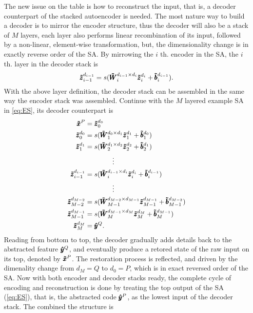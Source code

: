 {The new issue on the table is how to reconstruct the input, that is, a decoder counterpart of the stacked autoencoder is needed. The most nature way to build a decoder is to mirror the encoder structure, thus the decoder will also be a stack of $M$ layers, each layer also performs linear recombination of its input, followed by a non-linear, element-wise transformation, but, the dimensionality change is in exactly reverse order of the SA. By mirrowing the $i$ th. encoder in the SA, the $i$ th. layer in the decoder stack is
\begin{equation*}
  {\pmb{\tilde{z}}_{i-1}^{d_{i-1}}} = s(\pmb{\tilde{W}}_{i  }^{d_{i-1} \times d_{i  }} {\pmb{\tilde{z}}_{i  }^{d_{i  }}} + \pmb{\tilde{b}}_{i  }^{d_{i-1}}).
\end{equation*}
With the above layer definition, the decoder stack can be assembled in the same way the encoder stack was assembled. Continue with the $M$ layered example SA in \ref{eq:ES}, its decoder counterpart is
\begin{equation} \label{eq:DS}
\begin{split}
  \pmb{\tilde{x}}^P &= {\pmb{\tilde{z}}_{0}^{d_{0}}} \\
  {\pmb{\tilde{z}}_{0  }^{d_{0  }}} &= s(\pmb{\tilde{W}}_{1  }^{d_{0  } \times d_{1  }} {\pmb{\tilde{z}}_{1  }^{d_{1  }}} + \pmb{\tilde{b}}_{1  }^{d_{0  }}) \\
  {\pmb{\tilde{z}}_{1  }^{d_{1  }}} &= s(\pmb{\tilde{W}}_{2  }^{d_{1  } \times d_{2  }} {\pmb{\tilde{z}}_{2  }^{d_{2  }}} + \pmb{\tilde{b}}_{2  }^{d_{1  }}) \\
  & \quad \quad \quad \quad \vdots \\
  {\pmb{\tilde{z}}_{i-1}^{d_{i-1}}} &= s(\pmb{\tilde{W}}_{i  }^{d_{i-1} \times d_{i  }} {\pmb{\tilde{z}}_{i  }^{d_{i  }}} + \pmb{\tilde{b}}_{i  }^{d_{i-1}}) \\
  & \quad \quad \quad \quad \vdots \\
  {\pmb{\tilde{z}}_{M-2}^{d_{M-2}}} &= s(\pmb{\tilde{W}}_{M-1}^{d_{M-2} \times d_{M-1}} {\pmb{\tilde{z}}_{M-1}^{d_{M-1}}} + \pmb{\tilde{b}}_{M-1}^{d_{M-2}}) \\
  {\pmb{\tilde{z}}_{M-1}^{d_{M-1}}} &= s(\pmb{\tilde{W}}_{M  }^{d_{M-1} \times d_{M  }} {\pmb{\tilde{z}}_{M  }^{d_{M  }}} + \pmb{\tilde{b}}_{M  }^{d_{M-1}}) \\
  {\pmb{\tilde{z}}_{M  }^{d_{M  }}} &= \pmb{\hat{y}}^Q .
\end{split}
\end{equation}
Reading from bottom to top, the decoder gradually adds details back to the abstracted feature $\pmb{\hat{y}}^Q$, and eventually produce a retored state of the raw input on its top, denoted by $\pmb{\tilde{x}}^P$. The restoration process is reflected, and driven by the dimenality change from $d_M = Q$ to $d_0 = P$, which is in exact reversed order of the SA. Now with both encoder and decoder stacks ready, the complete cycle of encoding and reconstruction is done by treating the top output of the SA (\ref{eq:ES}), that is, the abstracted code $\pmb{\hat{y}}^P$, as the lowest input of the decoder stack. The combined the structure is
}
